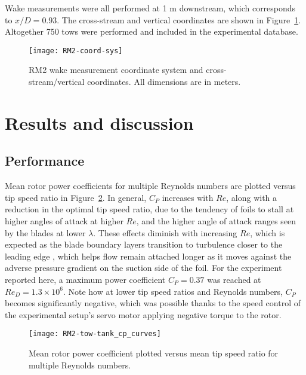 Wake measurements were all performed at 1 m downstream, which corresponds to
$x/D = 0.93$. The cross-stream and vertical coordinates are shown in
Figure~\ref{fig:coordinates}. Altogether 750 tows were performed and included in
the experimental database.

\begin{figure}
    \centering

    \texttt{[image: RM2-coord-sys]}
    
    \caption{RM2 wake measurement coordinate system and cross-stream/vertical
        coordinates. All dimensions are in meters.}
    
    \label{fig:coordinates}
\end{figure}


\section{Results and discussion}

\subsection{Performance}

Mean rotor power coefficients for multiple Reynolds numbers are plotted versus
tip speed ratio in Figure~\ref{fig:cp-curves}. In general, $C_P$ increases with
$Re$, along with a reduction in the optimal tip speed ratio, due to the tendency
of foils to stall at higher angles of attack at higher $Re$, and the higher
angle of attack ranges seen by the blades at lower $\lambda$. These effects
diminish with increasing $Re$, which is expected as the blade boundary layers
transition to turbulence closer to the leading edge \cite{Lissaman1983,
    McMasters1980, Bachant2016-RVAT-Re-dep}, which helps flow remain attached longer
as it moves against the adverse pressure gradient on the suction side of the
foil. For the experiment reported here, a maximum power coefficient $C_P=0.37$
was reached at $Re_D=1.3 \times 10^6$. Note how at lower tip speed ratios and
Reynolds numbers, $C_P$ becomes significantly negative, which was possible
thanks to the speed control of the experimental setup's servo motor applying
negative torque to the rotor.

\begin{figure}
    \centering

    \texttt{[image: RM2-tow-tank\_cp\_curves]}
    
    \caption{Mean rotor power coefficient plotted versus mean tip speed ratio
        for multiple Reynolds numbers.}
    
    \label{fig:cp-curves}
\end{figure}

